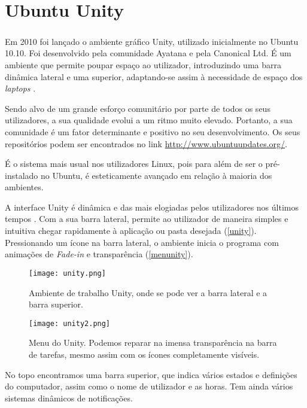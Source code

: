 \documentclass[11pt,openright,twoside]{report}
\begin{document}
\chapter{Ubuntu Unity}

\paragraph{  }Em 2010 foi lançado o ambiente gráfico Unity, utilizado inicialmente no Ubuntu 10.10. Foi desenvolvido pela comunidade Ayatana e pela Canonical Ltd. É um ambiente que permite poupar espaço ao utilizador, introduzindo uma barra dinâmica lateral e uma superior, adaptando-se assim à necessidade de espaço dos \textit{laptops} \cite{Unity}.

Sendo alvo de um grande esforço comunitário por parte de todos os seus utilizadores, a sua qualidade evolui a um ritmo muito elevado. Portanto, a sua comunidade é um fator determinante e positivo no seu desenvolvimento. Os seus repositórios podem ser encontrados no link \url{http://www.ubuntuupdates.org/}.

É o sistema mais usual nos utilizadores Linux, pois para além de ser o pré-instalado no Ubuntu, é esteticamente avançado em relação à maioria dos ambientes.

A interface Unity é dinâmica e das mais elogiadas pelos utilizadores nos últimos tempos \cite{ApreciacaoUnity}. Com a sua barra lateral, permite ao utilizador de maneira simples e intuitiva chegar rapidamente à aplicação ou pasta desejada (\autoref{unity}). Pressionando um ícone na barra lateral, o ambiente inicia o programa com animações de \textit{Fade-in} e transparência (\autoref{menunity}).

\begin{figure}
 \center
 \texttt{[image: unity.png]}
 \caption{Ambiente de trabalho Unity, onde se pode ver a barra lateral e a barra superior.}
 \label{unity}
\end{figure}

\begin{figure}
 \center
 \texttt{[image: unity2.png]}
 \caption{Menu do Unity. Podemos reparar na imensa transparência na barra de tarefas, mesmo assim com os ícones completamente visíveis.}
 \label{menunity}
\end{figure}

No topo encontramos uma barra superior, que indica vários estados e definições do computador, assim como o nome de utilizador e as horas. Tem ainda vários sistemas dinâmicos de notificações.
\end{document}
